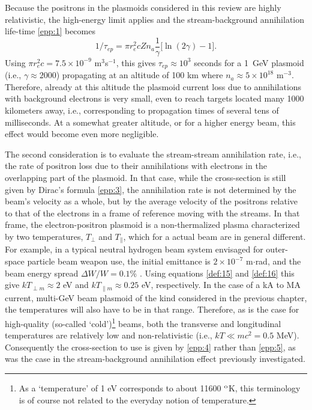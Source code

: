 \documentclass [12pt,a4paper,     ]{report} %
\newcommand{\tr}{\pmb{\perp}}         %
\newcommand{\lo}{\pmb{\parallel}}     %
\begin{document}
   Because the positrons in the plasmoids considered in this review are highly relativistic, the high-energy limit applies and the stream-background annihilation life-time \eqref{epp:1} becomes
%
\begin{equation} \label{epp:6} 
   1/\tau_{ep} = \pi r_e^2 c Zn_a\frac{1}{\gamma} 
                 \bigl[ \ln (2\gamma) -1 \bigr].
\end{equation}
%
Using $\pi r_e^2 c = 7.5 \times 10^{-9}$ m$^{3}$s$^{-1}$, this gives $\tau_{ep} \approx 10^{3}$ seconds for a 1~GeV plasmoid (i.e., $\gamma \approx 2000$) propagating at an altitude of 100 km where $n_a \approx 5 \times 10^{18}$ m$^{-3}$. Therefore, already at this altitude the plasmoid current loss due to annihilations with background electrons is very small, even to reach targets located many 1000 kilometers away, i.e., corresponding to propagation times of several tens of milliseconds.  At a somewhat greater altitude, or for a higher energy beam, this effect would become even more negligible.

The second consideration is to evaluate the stream-stream annihilation rate, i.e., the rate of positron loss due to their annihilations with electrons in the overlapping part of the plasmoid.  In that case, while the cross-section is still given by Dirac's formula \eqref{epp:3}, the annihilation rate is not determined by the beam's velocity as a whole, but by the average velocity of the positrons relative to that of the electrons in a frame of reference moving with the streams.  In that frame, the electron-positron plasmoid is a non-thermalized plasma characterized by two temperatures, $T_{\perp}$ and $T_{\|}$, which for a actual beam are in general different.  For example, in a typical neutral hydrogen beam system envisaged for outer-space particle beam weapon use, the initial emittance is $2 \times 10^{-7}$ m$\cdot$rad, and the beam energy spread $\Delta W/W = 0.1\%$ \cite[p.24-77]{KNAPP1980-}.  Using equations \eqref{def:15} and  \eqref{def:16} this give  $kT_{\tr m} \approx 2$ eV and $kT_{\lo m} \approx 0.25$ eV, respectively.  In the case of a kA to MA current, multi-GeV beam plasmoid of the kind considered in the previous chapter, the temperatures will also have to be in that range.  Therefore, as is the case for high-quality (so-called `cold')\footnote{As a `temperature' of 1 eV corresponds to about 11600 $^{\rm{o}}$K, this terminology is of course not related to the everyday notion of temperature.} beams, both the transverse and longitudinal temperatures are relatively low and non-relativistic (i.e., $kT \ll mc^2 = 0.5$ MeV).  Consequently the cross-section to use is given by \eqref{epp:4} rather than \eqref{epp:5}, as was the case in the stream-background annihilation effect previously investigated.
\end{document}
